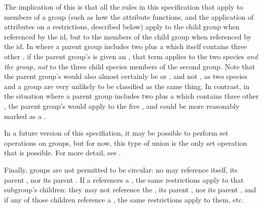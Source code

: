 The implication of this is that all the rules in this specification that apply to members of a group (such as how the  attribute functions, and the application of  attributes on a \ListOfMembers restrictions, described below) apply to the child group when referenced by the \Group id, but to the members of the child group when referenced by the \ListOfMembers id.  In  where a parent group includes two \Species plus a \Group which itself contains three other \Species, if the parent group's \ListOfMembers is given an , that term applies to the two species \emph{and the group, not} to the three child species members of the second group.  Note that the parent group's  would also almost certainly be  or , and not , as two species and a group are very unlikely to be classified as the same thing.  In contrast, in the situation where a parent group includes two \Species plus a \ListOfMembers which contains three other \Species, the parent group's \ListOfMembers {} would apply to the five \Species, and could be more reasonably marked as a .

In a future version of this specifiation, it may be possible to perform set operations on groups, but for now, this type of union is the only set operation that is possible.  For more detail, see .

Finally, groups are not permitted to be circular:  no \Member may reference itself, its parent \ListOfMembers, nor its parent \Group.  If a \Member references a \Group, the same restrictions apply to that subgroup's children:  they may not reference the \Member, its parent \ListOfMembers, nor its parent \Group, and if any of those children reference a \Group, the same restrictions apply to them, etc.

